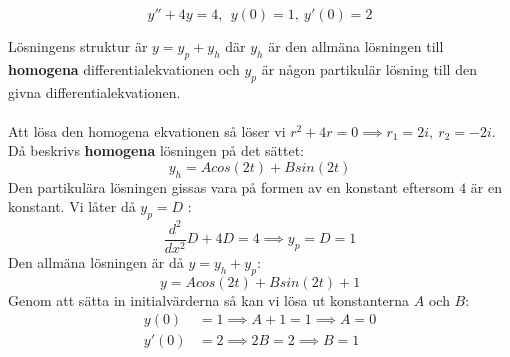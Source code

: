 \documentclass{report}
\begin{document}
{
\begin{equation*}
y''+4y = 4,\:\:y(0) = 1,\: y'(0) = 2
\end{equation*}

\sol Lösningens struktur är $ y = y_p + y_h $ där $ y_h $ är den allmäna lösningen till \textbf{homogena} differentialekvationen och $ y_p $ är någon partikulär lösning till den givna differentialekvationen.\\\\
\noindent
Att lösa den homogena ekvationen så löser vi $ r^2 + 4r = 0 \implies r_1 = 2i,\:r_2 = -2i $. Då beskrivs \textbf{homogena} lösningen på det sättet:
\begin{equation*}
y_h = Acos(2t) + Bsin(2t)
\end{equation*}
Den partikulära lösningen gissas vara på formen av en konstant eftersom $ 4 $ är en konstant. Vi låter då $ y_p = D$ :
\begin{equation*}
\frac{d^2}{dx^2} D + 4D = 4 \implies y_p = D = 1
\end{equation*}
Den allmäna lösningen är då $ y = y_h+y_p $:
\begin{equation*}
y = Acos(2t) + Bsin(2t) + 1
\end{equation*}
Genom att sätta in initialvärderna så kan vi lösa ut konstanterna $ A $ och $ B $:
\begin{align*}
	y(0) &= 1 \implies A+1 = 1 \implies A = 0\\
	y'(0) &= 2 \implies 2B = 2 \implies B = 1
\end{align*}
}

\end{document}
